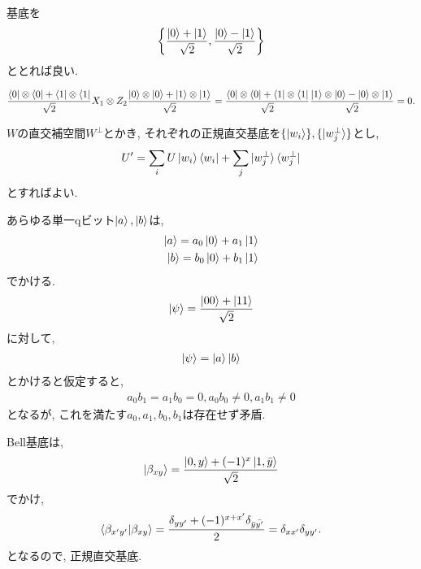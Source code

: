 \begin{ex}
    基底を
    \begin{align*}
        \left\{ \frac{\ket{0}+\ket{1}}{\sqrt{2}},  \frac{\ket{0}-\ket{1}}{\sqrt{2}}\right\}
    \end{align*}
    ととれば良い.
\end{ex}

\begin{ex}
    \begin{align*}
        \frac{\bra{0}\otimes\bra{0} + \bra{1}\otimes \bra{1}}{\sqrt{2}}
        X_1 \otimes Z_2
        \frac{\ket{0} \otimes \ket{0} + \ket{1} \otimes \ket{1}}{\sqrt{2}}
        =
        \frac{\bra{0}\otimes\bra{0} + \bra{1}\otimes \bra{1}}{\sqrt{2}}
        \frac{\ket{1} \otimes \ket{0} - \ket{0} \otimes \ket{1}}{\sqrt{2}}
        =0.
    \end{align*}
\end{ex}

\begin{ex}
    $W$の直交補空間$W^{\perp}$とかき, それぞれの正規直交基底を$\{ \ket{w_i}\}, \{ \ket{w^{\perp}_j}\}$とし,
    \begin{align*}
        U'
        =
        \sum_{i} U\ket{w_i} \bra{w_i}
        +
        \sum_{j} \ket{w^\perp_j} \bra{w^\perp_j}
    \end{align*}
    とすればよい.
\end{ex}

\begin{ex}
    \label{ex2.68}
    あらゆる単一qビット$\ket{a},\ket{b}$は,
    \begin{align*}
        \ket{a} = a_0 \ket{0} + a_1 \ket{1}
        \\
        \ket{b} = b_0 \ket{0} + b_1 \ket{1}
    \end{align*}
    でかける.
    \begin{align*}
        \ket{\psi} = \frac{\ket{00} + \ket{11}}{\sqrt{2}}
    \end{align*}
    に対して,
    \begin{align*}
        \ket{\psi}
        =
        \ket{a} \ket{b}
    \end{align*}
    とかけると仮定すると,
    \begin{align*}
        a_0 b_1 = a_1 b_0 = 0, a_0 b_0 \neq 0, a_1 b_1 \neq 0
    \end{align*}
    となるが, これを満たす$a_0, a_1, b_0, b_1$は存在せず矛盾.
\end{ex}

\begin{ex}
    \label{ex2.69}
    Bell基底は,
    \begin{align*}
        \ket{\beta_{xy}} = \frac{\ket{0,y}+ (-1)^x\ket{1,\bar{y}}}{\sqrt{2}}
    \end{align*}
    でかけ,
    \begin{align*}
        \braket{\beta_{x'y'}|\beta_{xy}} = \frac{\delta_{yy'}+ (-1)^{x+x'}\delta_{\bar{y}\bar{y'}}}{2} = \delta_{xx'}\delta_{yy'}.
    \end{align*}
    となるので, 正規直交基底.
\end{ex}

